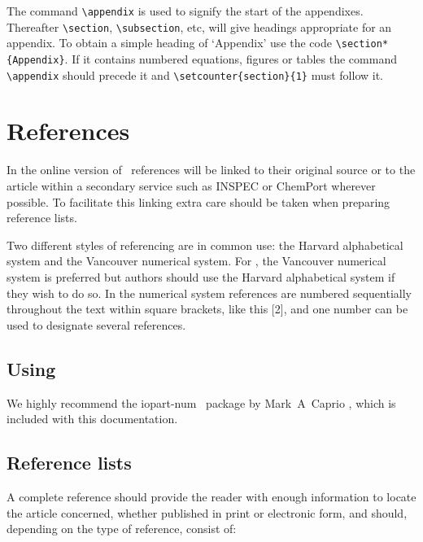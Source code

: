 \documentclass[a4paper]{jpconf}
\begin{document}
The command \verb"\appendix" is used to signify the start of the
appendixes. Thereafter \verb"\section", \verb"\subsection", etc, will
give headings appropriate for an appendix. To obtain a simple heading of
`Appendix' use the code \verb"\section*{Appendix}". If it contains
numbered equations, figures or tables the command \verb"\appendix" should
precede it and \verb"\setcounter{section}{1}" must follow it.

\section{References}
In the online version of \jpcs\ references will be linked to their original source or to the article within a secondary service such as INSPEC or ChemPort wherever possible. To facilitate this linking extra care should be taken when preparing reference lists.

Two different styles of referencing are in common use: the Harvard alphabetical system and the Vancouver numerical system.  For \jpcs, the Vancouver numerical system is preferred but authors should use the Harvard alphabetical system if they wish to do so. In the numerical system references are numbered sequentially throughout the text within square brackets, like this [2], and one number can be used to designate several references.

\subsection{Using \BibTeX}
We highly recommend the {\ttfamily\textbf\selectfont iopart-num} \BibTeX\ package by Mark~A~Caprio \cite{iopartnum}, which is included with this documentation.

\subsection{Reference lists}
A complete reference should provide the reader with enough information to locate the article concerned, whether published in print or electronic form, and should, depending on the type of reference, consist of:
\end{document}
